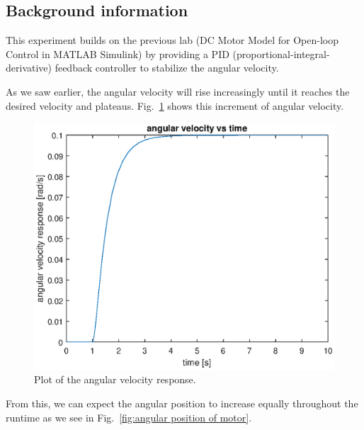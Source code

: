 \documentclass[12pt]{article}
\begin{document}
\subsection{Background information}\label{ssc:background}

This experiment builds on the previous lab (DC Motor Model for Open-loop Control in MATLAB Simulink) by providing a PID (proportional-integral-derivative) feedback controller to stabilize the angular velocity.

As we saw earlier, the angular velocity will rise increasingly until it reaches the desired velocity and plateaus. Fig.~\ref{fig:plot of angular velocity} shows this increment of angular velocity.

\begin{figure}
    \centering
    \includegraphics[width=\linewidth]{img/task02_plot_angular_velocity.eps}
    \caption{Plot of the angular velocity response.}
    \label{fig:plot of angular velocity}
\end{figure}

From this, we can expect the angular position to increase equally throughout the runtime as we see in Fig.~\ref{fig:angular position of motor}.
\end{document}
